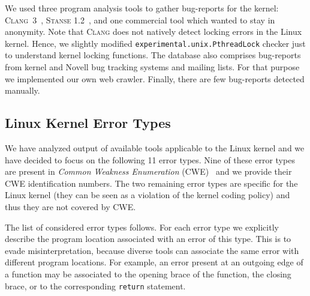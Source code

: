 \documentclass[10pt]{llncs}
\newcommand\clang{\textsc{Clang}\xspace}
\newcommand\stanse{\textsc{Stanse}\xspace}
\begin{document}
We used three program analysis tools to gather bug-reports for the kernel:
\clang~3~\cite{clang}, \stanse 1.2~\cite{stanse}, and one commercial tool
which wanted to stay in anonymity. Note that \clang does not natively detect
locking errors in the Linux kernel. Hence, we slightly modified
\texttt{experimental.unix.PthreadLock} checker just to understand kernel
locking functions. The database also comprises bug-reports from kernel and
Novell bug tracking systems and mailing lists. For that purpose we implemented
our own web crawler. Finally, there are few bug-reports detected manually.

\subsection{Linux Kernel Error Types} \label{sec:error_type}

We have analyzed output of available tools applicable to the Linux kernel
and we have decided to focus on the following 11 error types. Nine of these
error types are present in \emph{Common Weakness Enumeration}
(\textsc{CWE})~\cite{cwe} and we provide their CWE identification
numbers. The two remaining error types are specific for the Linux kernel
(they can be seen as a violation of the kernel coding policy) and thus they
are not covered by CWE.

The list of considered error types follows. For each error type we
explicitly describe the program location associated with an error of this
type. This is to evade misinterpretation, because diverse tools can associate
the same error with different program locations. For example, an error
present at an outgoing edge of a function may be associated to the opening
brace of the function, the closing brace, or to the corresponding
\texttt{return} statement.
\end{document}
